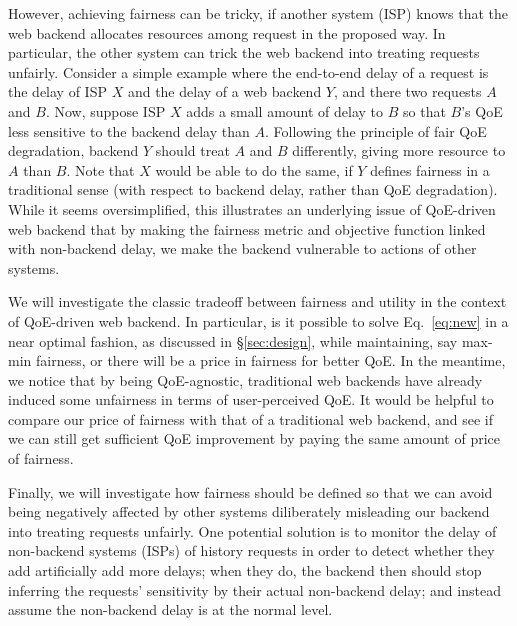 However, achieving fairness can be tricky, if another system (\eg ISP) knows that the web backend allocates resources among request in the proposed way. In particular, the other system can trick the web backend into treating requests unfairly.
Consider a simple example where the end-to-end delay of a request is the delay of ISP $X$ and the delay of a web backend $Y$, and there  two requests $A$ and $B$.
Now, suppose ISP $X$ adds a small amount of delay to $B$ so that $B$'s QoE less sensitive to the backend delay than $A$. Following the principle of fair QoE degradation, backend $Y$ should treat $A$ and $B$ differently, giving more resource to $A$ than $B$. 
Note that $X$ would be able to do the same, if $Y$ defines fairness in a traditional sense (\ie with respect to backend delay, rather than QoE degradation).
While it seems oversimplified, this illustrates an underlying issue of QoE-driven web backend that by making the fairness metric and objective function linked with non-backend delay, we make the backend vulnerable to actions of other systems.

We will investigate the classic tradeoff between fairness and utility in the context of QoE-driven web backend. In particular, is it possible to solve Eq.~\ref{eq:new} in a near optimal fashion, as discussed in \S\ref{sec:design}, while maintaining, say max-min fairness, or there will be a price in fairness for better QoE.
In the meantime, we notice that by being QoE-agnostic, traditional web backends have already induced some unfairness in terms of user-perceived QoE. It would be helpful to compare our price of fairness with that of a traditional web backend, and see if we can still get sufficient QoE improvement by paying the same amount of price of fairness.

Finally, we will investigate how fairness should be defined so that we can avoid being negatively affected by other systems diliberately misleading our backend into treating requests unfairly. One potential solution is to monitor the delay of non-backend systems (\eg ISPs) of history requests in order to detect whether they add artificially add more delays; when they do, the backend then should stop inferring the requests' sensitivity by their actual non-backend delay; and instead assume the non-backend delay is at the normal level.


